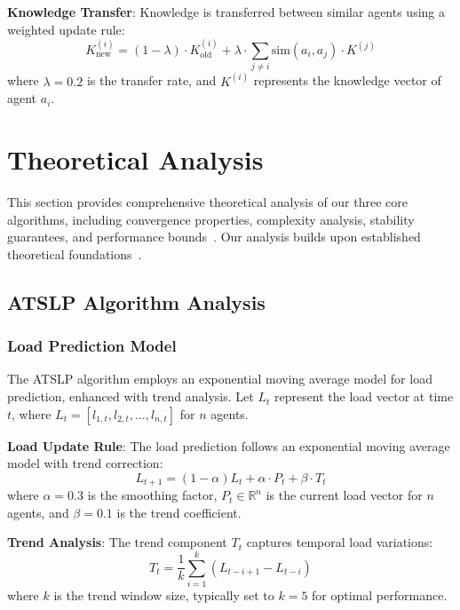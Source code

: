 \documentclass[conference]{IEEEtran}
\begin{document}
\textbf{Knowledge Transfer}: Knowledge is transferred between similar agents using a weighted update rule:
\begin{equation}
K_{\text{new}}^{(i)} = (1-\lambda) \cdot K_{\text{old}}^{(i)} + \lambda \cdot \sum_{j \neq i} \text{sim}(a_i, a_j) \cdot K^{(j)}
\end{equation}
where $\lambda = 0.2$ is the transfer rate, and $K^{(i)}$ represents the knowledge vector of agent $a_i$.

\section{Theoretical Analysis}

This section provides comprehensive theoretical analysis of our three core algorithms, including convergence properties, complexity analysis, stability guarantees, and performance bounds~\cite{sutton2018reinforcement,vaswani2017attention,cormen2009introduction}. Our analysis builds upon established theoretical foundations~\cite{skiena2008algorithm,sedgewick2011algorithms}.

\subsection{ATSLP Algorithm Analysis}

\subsubsection{Load Prediction Model}

The ATSLP algorithm employs an exponential moving average model for load prediction, enhanced with trend analysis. Let $L_t$ represent the load vector at time $t$, where $L_t = [l_{1,t}, l_{2,t}, \ldots, l_{n,t}]$ for $n$ agents.

\textbf{Load Update Rule}: The load prediction follows an exponential moving average model with trend correction:
\begin{equation}
L_{t+1} = (1-\alpha)L_t + \alpha \cdot P_t + \beta \cdot T_t
\end{equation}
where $\alpha = 0.3$ is the smoothing factor, $P_t \in \mathbb{R}^n$ is the current load vector for $n$ agents, and $\beta = 0.1$ is the trend coefficient.

\textbf{Trend Analysis}: The trend component $T_t$ captures temporal load variations:
\begin{equation}
T_t = \frac{1}{k}\sum_{i=1}^{k} (L_{t-i+1} - L_{t-i})
\end{equation}
where $k$ is the trend window size, typically set to $k = 5$ for optimal performance.
\end{document}

